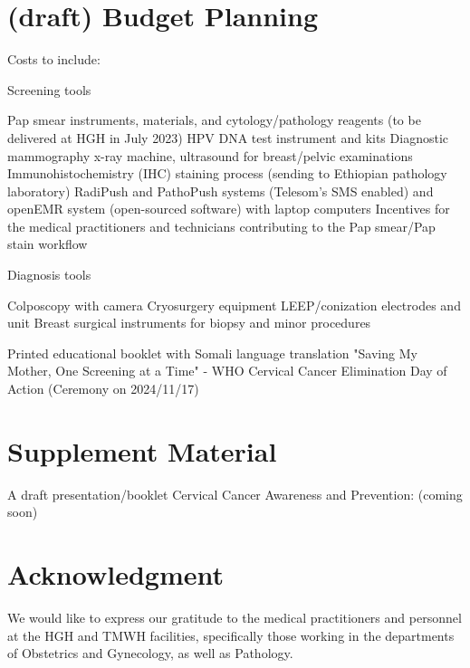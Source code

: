 \documentclass{article}
\begin{document}
\clearpage


\section{(draft) Budget Planning}
Costs to include:
\begin{outline}
\1 Screening tools

\2 Pap smear instruments, materials, and cytology/pathology reagents (to be delivered at HGH in July 2023)
\2 HPV DNA test instrument and kits
\2 Diagnostic mammography x-ray machine, ultrasound for breast/pelvic examinations
\2 Immunohistochemistry (IHC) staining process (sending to Ethiopian pathology laboratory)
\2 RadiPush and PathoPush systems (Telesom's SMS enabled) and openEMR system (open-sourced software) with laptop computers
\2 Incentives for the medical practitioners and technicians contributing to the Pap smear/Pap stain workflow

\1 Diagnosis tools

\2 Colposcopy with camera
\2 Cryosurgery equipment
\2 LEEP/conization electrodes and unit
\2 Breast surgical instruments for biopsy and minor procedures

\1 Printed educational booklet with Somali language translation
\1 "Saving My Mother, One Screening at a Time" - WHO Cervical Cancer Elimination Day of Action (Ceremony on 2024/11/17)


\end{outline}



\section{Supplement Material}
A draft presentation/booklet Cervical Cancer Awareness and Prevention: (coming soon)

%

\section{Acknowledgment}
We would like to express our gratitude to the medical practitioners and personnel at the HGH and TMWH facilities, specifically those working in the departments of Obstetrics and Gynecology, as well as Pathology.


\end{document}
